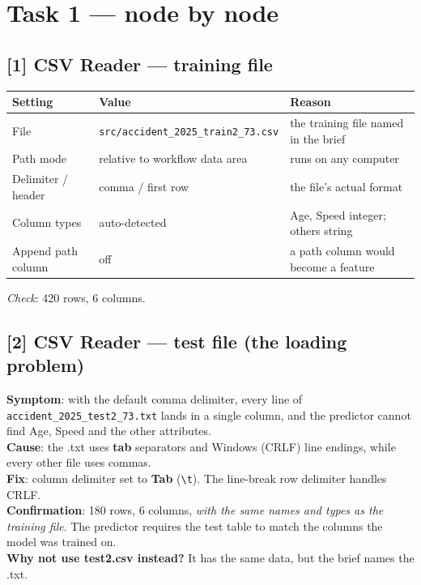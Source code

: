 \documentclass[11pt,a4paper]{article}
\newcommand{\cd}[1]{\texttt{#1}}                     %
\begin{document}
\section{Task 1 --- node by node}

\subsection*{[1] CSV Reader --- training file}
\begin{tabularx}{\linewidth}{@{}p{3.4cm}p{3.6cm}L@{}}
\toprule Setting & Value & Reason \\ \midrule
File & \cd{src/accident\_2025\_}\newline\cd{train2\_73.csv} & the training file named in the brief \\
Path mode & relative to workflow data area & runs on any computer \\
Delimiter / header & comma / first row & the file's actual format \\
Column types & auto-detected & Age, Speed integer; others string \\
Append path column & off & a path column would become a feature \\ \bottomrule
\end{tabularx}
\textit{Check}: 420 rows, 6 columns.

\subsection*{[2] CSV Reader --- test file (the loading problem)}
\begin{issue}
\textbf{Symptom}: with the default comma delimiter, every line of \cd{accident\_2025\_test2\_73.txt} lands in a single
column, and the predictor cannot find Age, Speed and the other attributes.\\
\textbf{Cause}: the .txt uses \textbf{tab} separators and Windows (CRLF) line endings, while every other file
uses commas.\\
\textbf{Fix}: column delimiter set to \textbf{Tab} (\cd{\textbackslash t}). The line-break row delimiter handles CRLF.\\
\textbf{Confirmation}: 180 rows, 6 columns, \emph{with the same names and types as the training file}. The predictor
requires the test table to match the columns the model was trained on.\\
\textbf{Why not use test2.csv instead?} It has the same data, but the brief names the .txt.
\end{issue}
\end{document}
